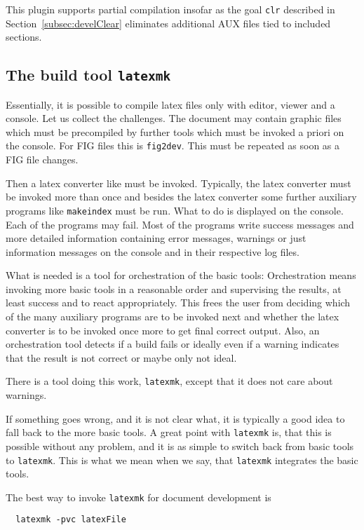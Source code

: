This plugin supports partial compilation 
insofar as the goal \texttt{clr} described in Section~\ref{subsec:develClear} 
eliminates additional AUX files tied to included sections. 


\subsection{The build tool \texttt{latexmk}}\label{subsec:develLatexmk}

Essentially, it is possible to compile latex files only with editor, viewer and a console. 
Let us collect the challenges. 
The document may contain graphic files which must be precompiled by further tools 
which must be invoked a priori on the console. 
For FIG files this is \texttt{fig2dev}. 
This must be repeated as soon as a FIG file changes. 

Then a latex converter like \lualatex{} must be invoked. 
Typically, the latex converter must be invoked more than once 
and besides the latex converter 
some further auxiliary programs like \texttt{makeindex} must be run. 
What to do is displayed on the console. 
Each of the programs may fail. 
Most of the programs write success messages and more detailed information 
containing error messages, warnings or just information messages 
on the console and in their respective log files. 

What is needed is a tool for orchestration of the basic tools: 
Orchestration means invoking more basic tools in a reasonable order 
and supervising the results, at least success and to react appropriately. 
This frees the user from deciding 
which of the many auxiliary programs are to be invoked next 
and whether the latex converter is to be invoked once more 
to get final correct output. 
Also, an orchestration tool detects if a build fails 
or ideally even if a warning indicates 
that the result is not correct or maybe only not ideal. 

There is a tool doing this work, \texttt{latexmk}, 
except that it does not care about warnings. 

If something goes wrong, and it is not clear what, 
it is typically a good idea to fall back to the more basic tools. 
A great point with \texttt{latexmk} is, that this is possible without any problem, 
and it is as simple to switch back from basic tools to \texttt{latexmk}. 
This is what we mean when we say, that \texttt{latexmk} integrates the basic tools. 

The best way to invoke \texttt{latexmk} for document development is 
%
\begin{Verbatim}
  latexmk -pvc latexFile
\end{Verbatim}

